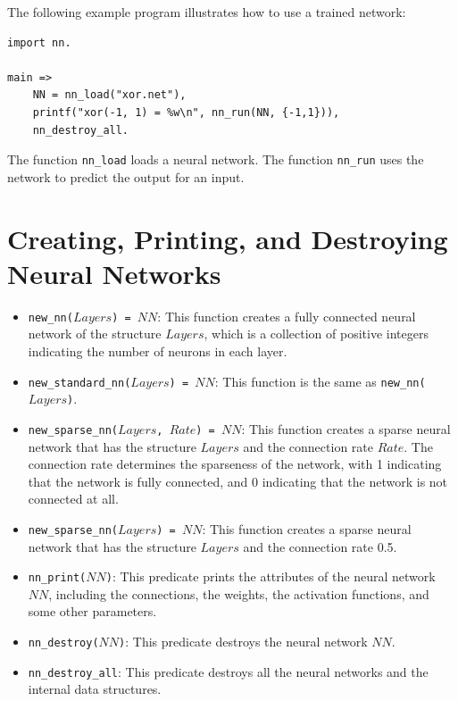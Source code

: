 The following example program illustrates how to use a trained network:
\begin{verbatim}
import nn.

main =>
    NN = nn_load("xor.net"),
    printf("xor(-1, 1) = %w\n", nn_run(NN, {-1,1})),
    nn_destroy_all.
\end{verbatim}
The function \texttt{nn\_load} loads a neural network. The function \texttt{nn\_run} uses the network to predict the output for an input.

\section{Creating, Printing, and Destroying Neural Networks}
\begin{itemize}
\item \texttt{new\_nn($Layers$) = $NN$}: This function creates a fully connected neural network of the structure $Layers$, which is a collection of positive integers indicating the number of neurons in each layer.

\item \texttt{new\_standard\_nn($Layers$) = $NN$}: This function is the same as \texttt{new\_nn($Layers$)}.

\item \texttt{new\_sparse\_nn($Layers$, $Rate$) = $NN$}: This function creates a sparse neural network that has the structure $Layers$ and the connection rate $Rate$. The connection rate determines the sparseness of the network, with 1 indicating that the network is fully connected, and 0 indicating that the network is not connected at all.

\item \texttt{new\_sparse\_nn($Layers$) = $NN$}: This function creates a sparse neural network that has the structure $Layers$ and the connection rate 0.5.

\item \texttt{nn\_print($NN$)}: This predicate prints the attributes of the neural network $NN$, including the connections, the weights, the activation functions, and some other parameters.

\item \texttt{nn\_destroy($NN$)}: This predicate destroys the neural network $NN$.

\item \texttt{nn\_destroy\_all}: This predicate destroys all the neural networks and the internal data structures.
\end{itemize}

